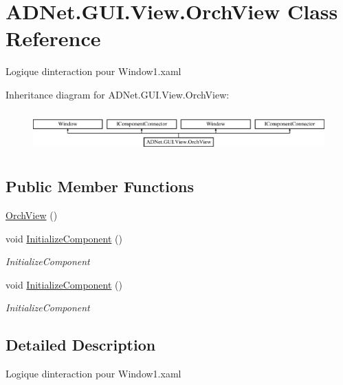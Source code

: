 \hypertarget{class_a_d_net_1_1_g_u_i_1_1_view_1_1_orch_view}{}\section{A\+D\+Net.\+G\+U\+I.\+View.\+Orch\+View Class Reference}
\label{class_a_d_net_1_1_g_u_i_1_1_view_1_1_orch_view}


Logique d\textquotesingle{}interaction pour Window1.\+xaml  


Inheritance diagram for A\+D\+Net.\+G\+U\+I.\+View.\+Orch\+View\+:\begin{figure}[H]
\begin{center}
\leavevmode
\includegraphics[height=1.609195cm]{class_a_d_net_1_1_g_u_i_1_1_view_1_1_orch_view}
\end{center}
\end{figure}
\subsection*{Public Member Functions}
\begin{DoxyCompactItemize}
\item 
\hyperlink{class_a_d_net_1_1_g_u_i_1_1_view_1_1_orch_view_a9769ac965569c054eb6c6d753501e480}{Orch\+View} ()
\item 
void \hyperlink{class_a_d_net_1_1_g_u_i_1_1_view_1_1_orch_view_af719b7ad90d168d17d8bb05669356549}{Initialize\+Component} ()
\begin{DoxyCompactList}\small\item\em Initialize\+Component \end{DoxyCompactList}\item 
void \hyperlink{class_a_d_net_1_1_g_u_i_1_1_view_1_1_orch_view_af719b7ad90d168d17d8bb05669356549}{Initialize\+Component} ()
\begin{DoxyCompactList}\small\item\em Initialize\+Component \end{DoxyCompactList}\end{DoxyCompactItemize}


\subsection{Detailed Description}
Logique d\textquotesingle{}interaction pour Window1.\+xaml 

